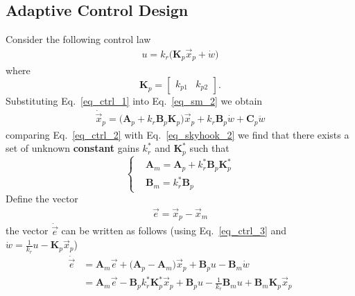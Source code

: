 \documentclass[12pt,a4paper,oneside]{book}
\begin{document}
\begin{onehalfspace}
\subsection{Adaptive Control Design} 
Consider the following control law
\begin{equation}\label{eq_ctrl_1}
	\begin{aligned}
		u = k_r\big(\mathbf{K}_p\vec{x}_p + \dot{w}\big)
	\end{aligned}
\end{equation} 
where \begin{equation}
	\mathbf{K}_p=\begin{bmatrix} k_{p1} & k_{p2}\end{bmatrix}.
\end{equation}
Substituting Eq.~\ref{eq_ctrl_1} into Eq.~\ref{eq_sm_2} we obtain
\begin{equation}\label{eq_ctrl_2}
	\begin{aligned}
		\dot{\vec{x}}_p = \Bigg(\mathbf{A}_p+k_r\mathbf{B}_p\mathbf{K}_p\Bigg){\vec{x}}_p + k_r\mathbf{B}_p \dot{w} + \mathbf{C}_p\ddot{w} 
	\end{aligned}
\end{equation}
comparing Eq.~\ref{eq_ctrl_2} with Eq.~\ref{eq_skyhook_2} we find that there exists a set of unknown \textbf{constant} gains $k_r^*$ and $\mathbf{K}_p^*$ such that
\begin{equation}\label{eq_ctrl_3}
	\left\lbrace \begin{aligned}
		&\mathbf{A}_m = \mathbf{A}_p+k_r^* \mathbf{B}_p \mathbf{K}_p^* \\[6pt]
		&\mathbf{B}_m = k_r^*\mathbf{B}_p
	\end{aligned}\right. 
\end{equation}
Define the vector
\begin{equation}\label{eq_ctrl_4}
	\begin{aligned}
		\vec{e} = \vec{x}_p-\vec{x}_m
	\end{aligned}
\end{equation}
the vector $\dot{\vec{e}}$ can be written as follows (using Eq.~\ref{eq_ctrl_3} and $\dot{w}=\frac{1}{k_r}u-\mathbf{K}_p\vec{x}_p$)
\begin{equation}\label{eq_ctrl_5}
	\begin{aligned}
		\dot{\vec{e}} &= \mathbf{A}_m\vec{e}+\Big(\mathbf{A}_p-\mathbf{A}_m\Big)\vec{x}_p+\mathbf{B}_pu-\mathbf{B}_m\dot{w} \\[8pt]
		&= \mathbf{A}_m\vec{e}-\mathbf{B}_pk_r^*\mathbf{K}_p^*\vec{x}_p+\mathbf{B}_pu-\frac{1}{k_r}\mathbf{B}_mu+\mathbf{B}_m\mathbf{K}_p\vec{x}_p

\end{aligned}
\end{equation}
\end{onehalfspace}
\end{document}
